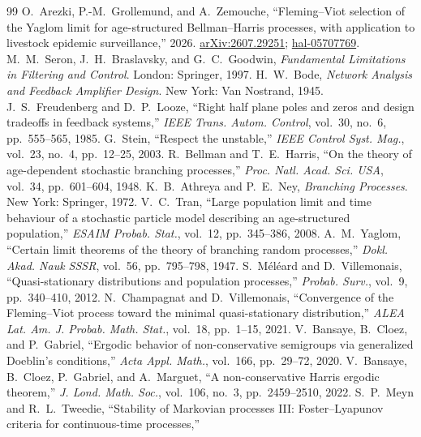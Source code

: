 \documentclass[letterpaper, 10pt, conference]{ieeeconf}
\newcommand{\ed}[1]{#1}
\begin{document}
\begin{thebibliography}{99}
 O.~Arezki, P.-M.~Grollemund, and A.~Zemouche,
``Fleming--Viot selection of the Yaglom limit for age-structured
Bellman--Harris processes, with application to livestock epidemic
surveillance,''\ed{ 2026. \href{https://arxiv.org/abs/2607.29251}{arXiv:2607.29251};
\href{https://hal.science/hal-05707769v1}{hal-05707769}.}
%
 M.~M.~Seron, J.~H.~Braslavsky, and G.~C.~Goodwin, \emph{Fundamental
Limitations in Filtering and Control}. London: Springer, 1997.
%
 H.~W.~Bode, \emph{Network Analysis and Feedback Amplifier
Design}. New York: Van Nostrand, 1945.
%
 J.~S.~Freudenberg and D.~P.~Looze, ``Right half plane
poles and zeros and design tradeoffs in feedback systems,'' \emph{IEEE Trans. Autom. Control}, vol.~30, no.~6, pp.~555--565, 1985.
%
 G.~Stein, ``Respect the unstable,'' \emph{IEEE Control Syst.
Mag.}, vol.~23, no.~4, pp.~12--25, 2003.
 R.~Bellman and T.~E.~Harris, ``On the theory of age-dependent
stochastic branching processes,'' \emph{Proc. Natl. Acad. Sci. USA}, vol.~34,
pp.~601--604, 1948.
 K.~B.~Athreya and P.~E.~Ney, \emph{Branching Processes}. New
York: Springer, 1972.
 V.~C.~Tran, ``Large population limit and time behaviour of a
stochastic particle model describing an age-structured population,''
\emph{ESAIM Probab. Stat.}, vol.~12, pp.~345--386, 2008.
 A.~M.~Yaglom, ``Certain limit theorems of the theory of
branching random processes,'' \emph{Dokl. Akad. Nauk SSSR}, vol.~56,
pp.~795--798, 1947.
 S.~M\'el\'eard and D.~Villemonais, ``Quasi-stationary
distributions and population processes,'' \emph{Probab. Surv.}, vol.~9,
pp.~340--410, 2012.
 N.~Champagnat and D.~Villemonais, ``Convergence of the Fleming--Viot
process toward the minimal quasi-stationary distribution,'' \emph{ALEA Lat. Am.
J. Probab. Math. Stat.}, vol.~18, pp.~1--15, 2021.
 V.~Bansaye, B.~Cloez, and P.~Gabriel, ``Ergodic behavior of
non-conservative semigroups via generalized Doeblin's conditions,''
\emph{Acta Appl. Math.}, vol.~166, pp.~29--72, 2020.
 V.~Bansaye, B.~Cloez, P.~Gabriel, and A.~Marguet, ``A
non-conservative Harris ergodic theorem,'' \emph{J. Lond. Math. Soc.},
vol.~106, no.~3, pp.~2459--2510, 2022.
 S.~P.~Meyn and R.~L.~Tweedie, ``Stability of Markovian
processes III: Foster--Lyapunov criteria for continuous-time processes,''

\end{thebibliography}
\end{document}
